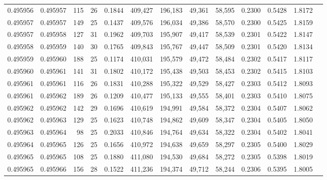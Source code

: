 \begin{tabular}{rrrrrrrrrrrrr}
0.495956 & 0.495957 & 115 &  26 &                                     0.1844 & 409,427 & 196,183 &  49,361 &  58,595 & 0.2300 & 0.5428 & 1.8172 \\
0.495957 & 0.495957 & 149 &  25 &                                     0.1437 & 409,576 & 196,034 &  49,386 &  58,570 & 0.2300 & 0.5425 & 1.8159 \\
0.495957 & 0.495958 & 127 &  31 &                                     0.1962 & 409,703 & 195,907 &  49,417 &  58,539 & 0.2301 & 0.5422 & 1.8147 \\
0.495958 & 0.495959 & 140 &  30 &                                     0.1765 & 409,843 & 195,767 &  49,447 &  58,509 & 0.2301 & 0.5420 & 1.8134 \\
0.495959 & 0.495960 & 188 &  25 &                                     0.1174 & 410,031 & 195,579 &  49,472 &  58,484 & 0.2302 & 0.5417 & 1.8117 \\
0.495960 & 0.495961 & 141 &  31 &                                     0.1802 & 410,172 & 195,438 &  49,503 &  58,453 & 0.2302 & 0.5415 & 1.8103 \\
0.495961 & 0.495961 & 116 &  26 &                                     0.1831 & 410,288 & 195,322 &  49,529 &  58,427 & 0.2303 & 0.5412 & 1.8093 \\
0.495961 & 0.495962 & 189 &  26 &                                     0.1209 & 410,477 & 195,133 &  49,555 &  58,401 & 0.2303 & 0.5410 & 1.8075 \\
0.495962 & 0.495962 & 142 &  29 &                                     0.1696 & 410,619 & 194,991 &  49,584 &  58,372 & 0.2304 & 0.5407 & 1.8062 \\
0.495962 & 0.495963 & 129 &  25 &                                     0.1623 & 410,748 & 194,862 &  49,609 &  58,347 & 0.2304 & 0.5405 & 1.8050 \\
0.495963 & 0.495964 &  98 &  25 &                                     0.2033 & 410,846 & 194,764 &  49,634 &  58,322 & 0.2304 & 0.5402 & 1.8041 \\
0.495964 & 0.495965 & 126 &  25 &                                     0.1656 & 410,972 & 194,638 &  49,659 &  58,297 & 0.2305 & 0.5400 & 1.8029 \\
0.495965 & 0.495965 & 108 &  25 &                                     0.1880 & 411,080 & 194,530 &  49,684 &  58,272 & 0.2305 & 0.5398 & 1.8019 \\
0.495965 & 0.495966 & 156 &  28 &                                     0.1522 & 411,236 & 194,374 &  49,712 &  58,244 & 0.2306 & 0.5395 & 1.8005 \\

\end{tabular}
